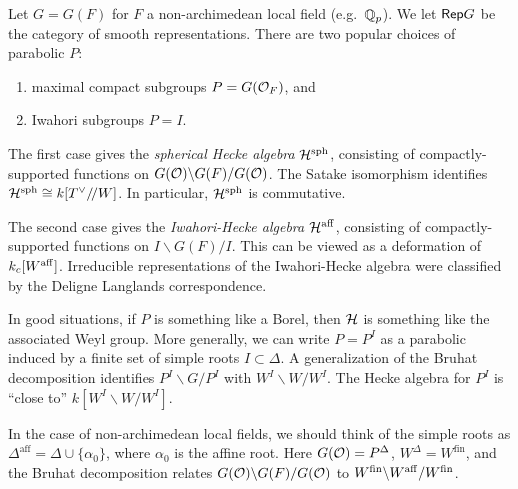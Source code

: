 \documentclass{article}
\begin{document}
\begin{ex}
	Let $G = G(F)$ for $F$ a non-archimedean local field (e.g.\ $\mathbb{Q}_p$).
	We let $\mathsf{Rep} G$ be the category of smooth representations.
	There are two popular choices of parabolic $P$:
	\begin{enumerate}
		\item maximal compact subgroups $P = G(\mathcal{O}_F)$, and 
		\item Iwahori subgroups $P = I$.
	\end{enumerate}
	
	The first case gives the \emph{spherical Hecke algebra} $\mathcal{H}^{\mathrm{sph}}$, consisting of compactly-supported functions on $G(\mathcal{O}) \backslash G(F) / G(\mathcal{O})$.
	The Satake isomorphism identifies $\mathcal{H}^{\mathrm{sph}} \cong k[T^\vee /\mkern-3mu/ W]$.
	In particular, $\mathcal{H}^{\mathrm{sph}}$ is commutative.

	The second case gives the \emph{Iwahori-Hecke algebra} $\mathcal{H}^{\mathrm{aff}}$, consisting of compactly-supported functions on $I \backslash G(F) / I$.
	This can be viewed as a deformation of $k_c[W^{\mathrm{aff}}]$.
	Irreducible representations of the Iwahori-Hecke algebra were classified by the Deligne Langlands correspondence.
\end{ex}

In good situations, if $P$ is something like a Borel, then $\mathcal{H}$ is something like the associated Weyl group.
More generally, we can write $P = P^I$ as a parabolic induced by a finite set of simple roots $I \subset \Delta$.
A generalization of the Bruhat decomposition identifies $P^I \backslash G / P^I$ with $W^I \backslash W / W^I$.
The Hecke algebra for $P^I$ is ``close to'' $k[W^I \backslash W / W^I]$.

\begin{ex}
	In the case of non-archimedean local fields, we should think of the simple roots as $\Delta^{\textrm{aff}} = \Delta \cup \{ \alpha_0 \}$, where $\alpha_0$ is the affine root.
	Here $G(\mathcal{O}) = P^\Delta$, $W^\Delta = W^{\mathrm{fin}}$, and the Bruhat decomposition relates $G(\mathcal{O}) \backslash G(F) / G(\mathcal{O})$ to $W^{\mathrm{fin}} \backslash W^{\mathrm{aff}} / W^{\mathrm{fin}}$.
\end{ex}
\end{document}
